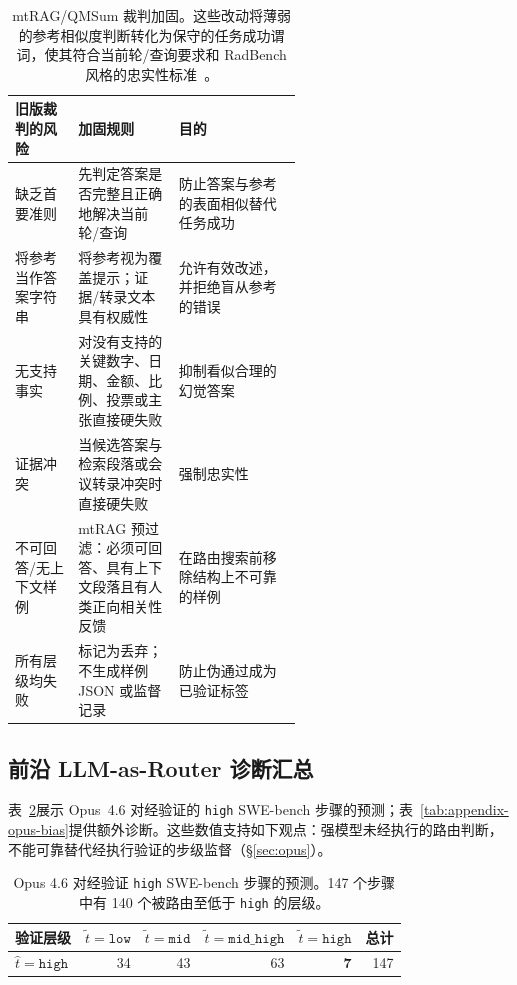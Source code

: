 \begin{table}[ht]
\centering
\small
\caption{mtRAG/QMSum 裁判加固。这些改动将薄弱的参考相似度判断转化为保守的任务成功谓词，使其符合当前轮/查询要求和 RadBench 风格的忠实性标准~\citep{kuo2025radbench}。}
\label{tab:appendix-judge}
\begin{tabularx}{\linewidth}{p{0.22\linewidth}p{0.35\linewidth}X}
\toprule
旧版裁判的风险 & 加固规则 & 目的 \\
\midrule
缺乏首要准则 &
  先判定答案是否完整且正确地解决当前轮/查询 &
  防止答案与参考的表面相似替代任务成功 \\
将参考当作答案字符串 &
  将参考视为覆盖提示；证据/转录文本具有权威性 &
  允许有效改述，并拒绝盲从参考的错误 \\
无支持事实 &
  对没有支持的关键数字、日期、金额、比例、投票或主张直接硬失败 &
  抑制看似合理的幻觉答案 \\
证据冲突 &
  当候选答案与检索段落或会议转录冲突时直接硬失败 &
  强制忠实性 \\
不可回答/无上下文样例 &
  mtRAG 预过滤：必须可回答、具有上下文段落且有人类正向相关性反馈 &
  在路由搜索前移除结构上不可靠的样例 \\
所有层级均失败 &
  标记为丢弃；不生成样例 JSON 或监督记录 &
  防止伪通过成为已验证标签 \\
\bottomrule
\end{tabularx}
\end{table}

\subsection{前沿 LLM-as-Router 诊断汇总}
\label{app:opus}

表~\ref{tab:opus-high}展示 Opus~4.6 对经验证的 \texttt{high} SWE-bench 步骤的预测；表~\ref{tab:appendix-opus-bias}提供额外诊断。这些数值支持如下观点：强模型未经执行的路由判断，不能可靠替代经执行验证的步级监督（\S\ref{sec:opus}）。

\begin{table}[ht]
\centering
\small
\begin{tabular}{lrrrrr}
\toprule
验证层级 & $\tilde{t}=\texttt{low}$ & $\tilde{t}=\texttt{mid}$ & $\tilde{t}=\texttt{mid\_high}$ & $\tilde{t}=\texttt{high}$ & 总计 \\
\midrule
$\hat{t}=\texttt{high}$ & 34 & 43 & 63 & \textbf{7} & 147 \\
\bottomrule
\end{tabular}
\caption{Opus 4.6 对经验证 \texttt{high} SWE-bench 步骤的预测。147 个步骤中有 140 个被路由至低于 \texttt{high} 的层级。}
\label{tab:opus-high}
\end{table}

